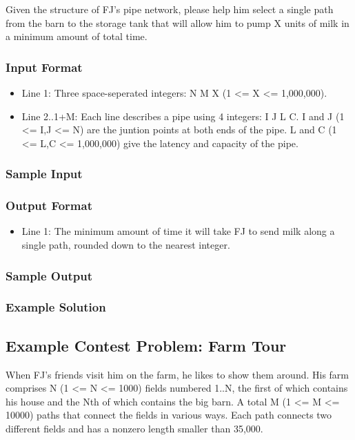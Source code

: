 Given the structure of FJ's pipe network, please help him select a single path from the barn to the storage tank that will allow him to pump X units
of milk in a minimum amount of total time.

\subsubsection{Input Format}
\begin{itemize}
	\item Line 1: Three space-seperated integers: N M X (1 <= X <= 1,000,000).
	\item Line 2..1+M: Each line describes a pipe using 4 integers: I J L C.
			I and J (1 <= I,J <= N) are the juntion points at both ends of the pipe.
			L and C (1 <= L,C <= 1,000,000) give the latency and capacity of the pipe.
\end{itemize}

\subsubsection{Sample Input}

\subsubsection{Output Format}
\begin{itemize}
	\item Line 1: The minimum amount of time it will take FJ to send milk along a single path, 
			rounded down to the nearest integer.
\end{itemize}

\subsubsection{Sample Output}

\subsubsection{Example Solution}

\subsection{Example Contest Problem: Farm Tour}
When FJ's friends visit him on the farm, he likes to show them around. 
His farm comprises N (1 <= N <= 1000) fields numbered 1..N, the first of which contains his house and the Nth of which contains the big barn. 
A total M (1 <= M <= 10000) paths that connect the fields in various ways. 
Each path connects two different fields and has a nonzero length smaller than 35,000. 

